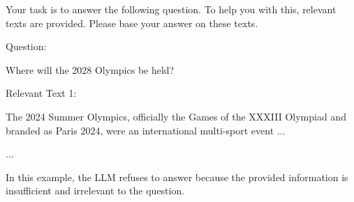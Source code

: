 \vspace{0.5em}
\begin{tcolorbox}

\begingroup
\setlength{\leftskip}{2em}
\setlength{\rightskip}{2em}

Your task is to answer the following question. To help you with this, relevant texts are provided. Please base your answer on these texts.

\vspace{0.2em}


\vspace{0.5em}

Question:

\vspace{0.2em}

Where will the 2028 Olympics be held?

\vspace{0.5em}

Relevant Text 1:

\vspace{0.2em}

The 2024 Summer Olympics, officially the Games of the XXXIII Olympiad and branded as Paris 2024, were an international multi-sport event ...

\vspace{0.5em}

...

\vspace{0.5em}

\underline{}

\endgroup

\end{tcolorbox}
\vspace{0.5em}

\noindent In this example, the LLM refuses to answer because the provided information is insufficient and irrelevant to the question.

